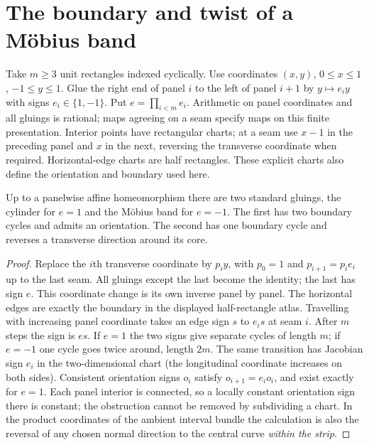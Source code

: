 \section{The boundary and twist of a Möbius band}\label{sec:ribbon}
Take $m\ge3$ unit rectangles indexed cyclically. Use coordinates $(x,y)$, $0\le x\le1$, $-1\le y\le1$. Glue the right end of panel $i$ to the left of panel $i+1$ by $y\mapsto e_i y$ with signs $e_i\in\{1,-1\}$. Put $e=\prod_{i<m}e_i$. Arithmetic on panel coordinates and all gluings is rational; maps agreeing on a seam specify maps on this finite presentation. Interior points have rectangular charts; at a seam use $x-1$ in the preceding panel and $x$ in the next, reversing the transverse coordinate when required. Horizontal-edge charts are half rectangles. These explicit charts also define the orientation and boundary used here.

\begin{theorem}\label{idx-ribbon4}
Up to a panelwise affine homeomorphism there are two standard gluings, the cylinder for $e=1$ and the Möbius band for $e=-1$. The first has two boundary cycles and admits an orientation. The second has one boundary cycle and reverses a transverse direction around its core.
\end{theorem}
\begin{proof}
Replace the $i$th transverse coordinate by $p_i y$, with $p_0=1$ and $p_{i+1}=p_i e_i$ up to the last seam. All gluings except the last become the identity; the last has sign $e$. This coordinate change is its own inverse panel by panel. The horizontal edges are exactly the boundary in the displayed half-rectangle atlas. Travelling with increasing panel coordinate takes an edge sign $s$ to $e_i s$ at seam $i$. After $m$ steps the sign is $es$. If $e=1$ the two signs give separate cycles of length $m$; if $e=-1$ one cycle goes twice around, length $2m$. The same transition has Jacobian sign $e_i$ in the two-dimensional chart (the longitudinal coordinate increases on both sides). Consistent orientation signs $o_i$ satisfy $o_{i+1}=e_i o_i$, and exist exactly for $e=1$. Each panel interior is connected, so a locally constant orientation sign there is constant; the obstruction cannot be removed by subdividing a chart. In the product coordinates of the ambient interval bundle the calculation is also the reversal of any chosen normal direction to the central curve \emph{within the strip}.
\end{proof}

